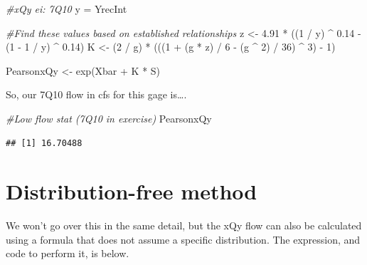 \documentclass[
]{book}
\newenvironment{Shaded}{\begin{snugshade}}{\end{snugshade}}
\newcommand{\CommentTok}[1]{\textcolor[rgb]{0.56,0.35,0.01}{\textit{#1}}}
\newcommand{\DecValTok}[1]{\textcolor[rgb]{0.00,0.00,0.81}{#1}}
\newcommand{\FloatTok}[1]{\textcolor[rgb]{0.00,0.00,0.81}{#1}}
\newcommand{\FunctionTok}[1]{\textcolor[rgb]{0.00,0.00,0.00}{#1}}
\newcommand{\NormalTok}[1]{#1}
\newcommand{\OtherTok}[1]{\textcolor[rgb]{0.56,0.35,0.01}{#1}}
\newcommand{\SpecialCharTok}[1]{\textcolor[rgb]{0.00,0.00,0.00}{#1}}
\begin{document}
\begin{Shaded}
\begin{Highlighting}[]
\CommentTok{\#xQy ei: 7Q10}
\NormalTok{y }\OtherTok{=}\NormalTok{ YrecInt}

\CommentTok{\#Find these values based on established relationships}
\NormalTok{z    }\OtherTok{\textless{}{-}} \FloatTok{4.91} \SpecialCharTok{*}\NormalTok{ ((}\DecValTok{1} \SpecialCharTok{/}\NormalTok{ y) }\SpecialCharTok{\^{}} \FloatTok{0.14} \SpecialCharTok{{-}}\NormalTok{ (}\DecValTok{1} \SpecialCharTok{{-}} \DecValTok{1} \SpecialCharTok{/}\NormalTok{ y) }\SpecialCharTok{\^{}} \FloatTok{0.14}\NormalTok{)}
\NormalTok{K    }\OtherTok{\textless{}{-}}\NormalTok{ (}\DecValTok{2} \SpecialCharTok{/}\NormalTok{ g) }\SpecialCharTok{*}\NormalTok{ (((}\DecValTok{1} \SpecialCharTok{+}\NormalTok{ (g }\SpecialCharTok{*}\NormalTok{ z) }\SpecialCharTok{/} \DecValTok{6} \SpecialCharTok{{-}}\NormalTok{ (g }\SpecialCharTok{\^{}} \DecValTok{2}\NormalTok{) }\SpecialCharTok{/} \DecValTok{36}\NormalTok{) }\SpecialCharTok{\^{}} \DecValTok{3}\NormalTok{) }\SpecialCharTok{{-}} \DecValTok{1}\NormalTok{) }

\NormalTok{PearsonxQy }\OtherTok{\textless{}{-}} \FunctionTok{exp}\NormalTok{(Xbar }\SpecialCharTok{+}\NormalTok{ K }\SpecialCharTok{*}\NormalTok{ S)}
\end{Highlighting}
\end{Shaded}

So, our 7Q10 flow in cfs for this gage is\ldots.

\begin{Shaded}
\begin{Highlighting}[]
\CommentTok{\#Low flow stat (7Q10 in exercise)}
\NormalTok{PearsonxQy}
\end{Highlighting}
\end{Shaded}

\begin{verbatim}
## [1] 16.70488
\end{verbatim}

\hypertarget{distribution-free-method}{%
\section{Distribution-free method}\label{distribution-free-method}}

We won't go over this in the same detail, but the xQy flow can also be calculated using a formula that does not assume a specific distribution. The expression, and code to perform it, is below.
\end{document}
